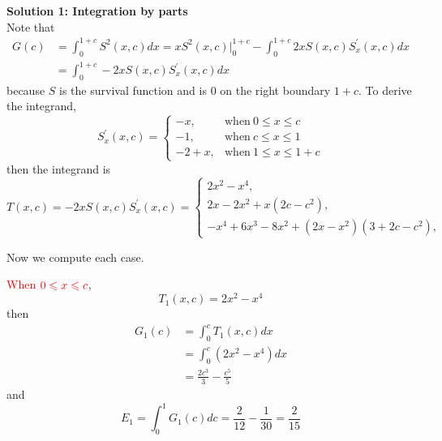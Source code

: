 \documentclass[12pt]{simple_doc}
\begin{document}
    \medskip
    \textbf{Solution 1: Integration by parts}\\
    Note that
    \begin{equation*}
        \begin{aligned}
            G(c) &= \int_0^{1 + c} S^2(x, c) dx = xS^2(x, c)\biggr\rvert_0^{1+c}
                    - \int_0^{1 + c} 2xS(x,c)S_x^{'}(x,c) dx\\
                 &= \int_0^{1 + c} -2xS(x,c)S_x^{'}(x,c) dx
        \end{aligned}
    \end{equation*}
    because $S$ is the survival function and is $0$ on the right boundary $1+c$. To derive the integrand,
    \begin{equation*}
        S_x^{'}(x, c) =
            \begin{cases}
              -x, & \text{when}\ 0 \leqslant x \leqslant c\\
              -1, & \text{when}\ c \leqslant x \leqslant 1\\
              -2 +x, & \text{when}\ 1 \leqslant x \leqslant 1 + c
            \end{cases}
    \end{equation*}
    then the integrand is
    \begin{equation*}
        T(x, c) = -2xS(x, c)S_x^{'}(x, c) =
            \begin{cases}
              2x^2 - x^4, &\\
              2x - 2x^2 + x(2c - c^2), &\\
              -x^4 +6x^3 -8x^2 + (2x - x^2)(3 + 2c - c^2), &
            \end{cases}
    \end{equation*}

    Now we compute each case.

    \textcolor{red}{When} $\color{red} 0 \leqslant x \leqslant c$,
    \begin{equation*}
        T_1(x, c) = 2x^2 - x^4
    \end{equation*}
    then
    \begin{equation*}
		\begin{aligned}
		G_1(c) &= \int_0^c T_1(x, c) dx \\
		   &= \int_0^c (2x^2 - x^4) dx\\
           &= \frac{2c^3}{3} - \frac{c^5}{5}
		\end{aligned}
	\end{equation*}
    and
    \begin{equation*}
        E_1 = \int_0^1 G_1(c)dc = \frac{2}{12} - \frac{1}{30} = \frac{2}{15}
    \end{equation*}
\end{document}
